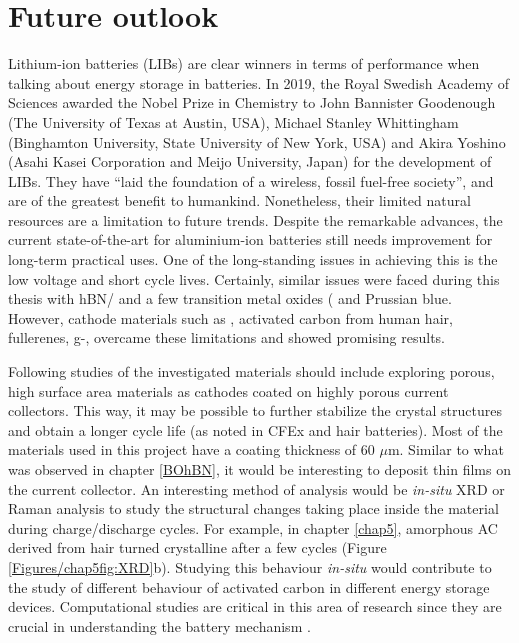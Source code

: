 \section{Future outlook}
Lithium-ion batteries (LIBs) are clear winners in terms of performance when talking about energy storage in batteries. In 2019, the Royal Swedish Academy of Sciences awarded the Nobel Prize in Chemistry to John Bannister Goodenough (The University of Texas at Austin, USA), Michael Stanley Whittingham (Binghamton University, State University of New York, USA) and Akira Yoshino (Asahi Kasei Corporation and Meijo University, Japan) for the development of LIBs. They have \enquote{laid the foundation of a wireless, fossil fuel-free society}, and are of the greatest benefit to humankind. Nonetheless, their limited natural resources are a limitation to future trends. 
Despite the remarkable advances, the current state-of-the-art for aluminium-ion batteries still needs improvement for long-term practical uses. One of the long-standing issues in achieving this is the low voltage and short cycle lives. Certainly, similar issues were faced during this thesis with hBN/ and a few transition metal oxides ( and Prussian blue. However, cathode materials such as \cite{divya_molybdenum_2019}, activated carbon from human hair, fullerenes, g-,  overcame these limitations and showed promising results. 

Following studies of the investigated materials should include exploring porous, high surface area materials as cathodes coated on highly porous current collectors. This way, it may be possible to further stabilize the crystal structures and obtain a longer cycle life (as noted in CFEx and hair batteries). Most of the materials used in this project have a coating thickness of 60 $\mu$m. Similar to what was observed in chapter \ref{BOhBN}, it would be interesting to deposit thin films on the current collector. An interesting method of analysis would be \textit{in-situ} XRD or Raman analysis to study the structural changes taking place inside the material during charge/discharge cycles. For example, in chapter \ref{chap5}, amorphous AC derived from hair turned crystalline after a few cycles (Figure \ref{Figures/chap5fig:XRD}b). Studying this behaviour \textit{in-situ} would contribute to the study of different behaviour of activated carbon in different energy storage devices. Computational studies are critical in this area of research since they are crucial in understanding the battery mechanism \cite{bhauriyal_computational_2017,gao_understanding_2017,bhauriyal_staging_2017,agiorgousis_role_2017}. 


